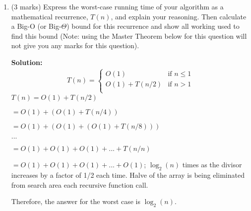 \documentclass[a4,13pt]{extarticle}
\newenvironment{Solution}{\color{blue}\textbf{Solution:}}{}
\begin{document}
\begin{enumerate}
\begin{enumerate}
	      	\newpage
	      	      	      	                  
	      	\item (3 marks) Express the worst-case running time of your algorithm as a mathematical recurrence, $T(n)$, and explain your reasoning. 
	      	      Then calculate a Big-O (or Big-$\Theta$) bound for this recurrence and show all working used to find this bound 
	      	      (Note: using the Master Theorem below for this question will not give you any marks for this question).
	      	      
	      	      
	        \begin{Solution}
	        \begin{align*}
	      	      	T(n)=\begin{cases}
	      	      	O(1) & \text{if $n \le 1$} \\
	      	      	O(1) + T(n/2) & \text{if $n > 1$}  \\
	      	      	\end{cases}
	      	      \end{align*}
	        $T(n) = O(1) + T(n/2)$
	        
	        $ = O(1) + (O(1) + T(n/4))$
	        
	        $ = O(1) + (O(1) + (O(1) + T(n/8)))$
	        
	        $...$
	        
	        $=O(1) + O(1) + O(1) + ... + T(n/n)$
	        
	        $=O(1) + O(1) + O(1) + ... + O(1)$; $\log_2(n)$ times as the divisor increases by a factor of 1/2 each time. Halve of the array is being eliminated from search area each recursive function call.
	       
	        Therefore, the answer for the worst case is $\log_2(n)$.

	      	\end{Solution}
	      	

\end{enumerate}
\end{enumerate}
\end{document}
